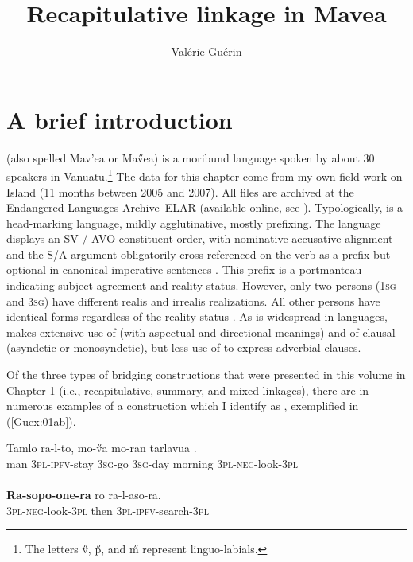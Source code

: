 \documentclass[output=paper]{LSP/langsci}
\author{
   Valérie Guérin\affiliation{Language and Culture Resource Center, James Cook University}
}
\title{Recapitulative linkage in Mavea}
\begin{document}
\section{A brief introduction} 
\label{Gusec:Introduction}
 (also spelled Mav'ea or Ma\H{v}ea) is a moribund  language spoken by about 30 speakers in Vanuatu.\footnote{The letters \H{v}, \H{p}, and \H{m} represent linguo-labials.} The data for this chapter come from my own field work on  Island (11 months between 2005 and 2007). All files are archived at the Endangered Languages Archive--ELAR (available online, see \citealt{guerin06}). Typologically,  is a head-marking language, mildly agglutinative, mostly prefixing. The language displays an SV / AVO constituent order, with nominative-accusative alignment and the S/A argument obligatorily cross-referenced on the verb as a prefix but optional in canonical imperative sentences \citep[][236]{guerin11}. This prefix is a portmanteau indicating subject agreement and reality status. However, only two persons (\textsc{1sg} and \textsc{3sg}) have different realis and irrealis realizations. All other persons have identical forms regardless of the reality status \citep[][61]{guerin11}. As is widespread in  languages,  makes extensive use of  (with aspectual and directional meanings) and of clausal  (asyndetic or monosyndetic), but less use of  to express adverbial clauses. 

Of the three types of bridging constructions that were presented in this volume in Chapter 1 (i.e., recapitulative, summary, and mixed linkages), there are in  numerous examples of a construction which I identify as , exemplified in (\ref{Guex:01ab}). 


\begin{exe}
\ex \label{Guex:01ab}
\begin{xlist}
\ex \label{Guex:01a}
\gll Tamlo   ra-l-to,            mo-\H{v}a    mo-ran      tarlavua  \underline{}.\\
man     \textsc{3pl}-\textsc{ipfv}-stay   \textsc{3sg}-go     \textsc{3sg}-day   morning  \textsc{3pl-neg}-look-\textsc{3pl}\\
\glt {}\\
\ex \label{Guex:01b}
\gll \textbf{Ra-sopo-one-ra} ro      ra-l-aso-ra.\\     	       
    \textsc{3pl-neg}-look-\textsc{3pl}   then  \textsc{3pl-ipfv}-search-\textsc{3pl}\\
\glt {} 
\end{xlist}
\end{exe}
\end{document}
